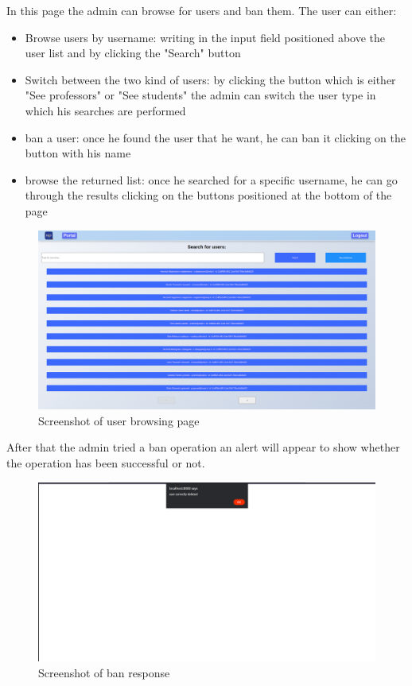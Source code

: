 In this page the admin can browse for users and ban them.
The user can either:
\begin{itemize}
    \item Browse users by username: writing in the input field positioned above the user list and by clicking the "Search" button
    \item Switch between the two kind of users: by clicking the button which is either "See professors" or "See students" the admin can switch the user type in which his searches are performed
    \item ban a user: once he found the user that he want, he can ban it clicking on the button with his name
    \item browse the returned list: once he searched for a specific username, he can go through the results clicking on the buttons positioned at the bottom of the page
\end{itemize}
\begin{figure}[H]
    \centering
    \includegraphics[width=\textwidth]{img/user_manual/admin/admin_search.png}
    \caption{Screenshot of user browsing page}
\end{figure}
After that the admin tried a ban operation an alert will appear to show whether the operation has been successful or not.
\begin{figure}[H]
    \centering
    \includegraphics[width=\textwidth]{img/user_manual/admin/ban-response.png}
    \caption{Screenshot of ban response}
\end{figure}